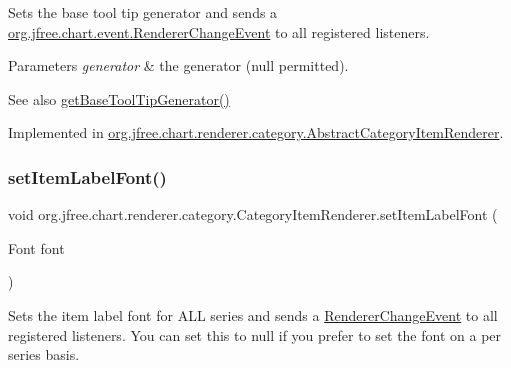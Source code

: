 Sets the base tool tip generator and sends a \mbox{\hyperlink{classorg_1_1jfree_1_1chart_1_1event_1_1_renderer_change_event}{org.\+jfree.\+chart.\+event.\+Renderer\+Change\+Event}} to all registered listeners.


\begin{DoxyParams}{Parameters}
{\em generator} & the generator ({\ttfamily null} permitted).\\
\hline
\end{DoxyParams}
\begin{DoxySeeAlso}{See also}
\mbox{\hyperlink{interfaceorg_1_1jfree_1_1chart_1_1renderer_1_1category_1_1_category_item_renderer_a7645a46ca7fd406133337313e00154aa}{get\+Base\+Tool\+Tip\+Generator()}} 
\end{DoxySeeAlso}


Implemented in \mbox{\hyperlink{classorg_1_1jfree_1_1chart_1_1renderer_1_1category_1_1_abstract_category_item_renderer_ab6112bf842d0a0e3324c1f657d24be9c}{org.\+jfree.\+chart.\+renderer.\+category.\+Abstract\+Category\+Item\+Renderer}}.

\mbox{\label{interfaceorg_1_1jfree_1_1chart_1_1renderer_1_1category_1_1_category_item_renderer_a685e145a5b47946554cc764973ace150}} 
\subsubsection{\texorpdfstring{set\+Item\+Label\+Font()}{setItemLabelFont()}}
{\footnotesize\ttfamily void org.\+jfree.\+chart.\+renderer.\+category.\+Category\+Item\+Renderer.\+set\+Item\+Label\+Font (\begin{DoxyParamCaption}\item[{Font}]{font }\end{DoxyParamCaption})}

Sets the item label font for A\+LL series and sends a \mbox{\hyperlink{}{Renderer\+Change\+Event}} to all registered listeners. You can set this to {\ttfamily null} if you prefer to set the font on a per series basis.


